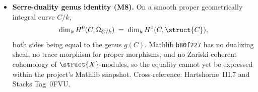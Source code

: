 \begin{itemize}
  \item \textbf{Serre-duality genus identity (M8).} On a smooth proper geometrically integral curve \(C/k\),
  \[
    \dim_{k} H^{0}(C, \Omega_{C/k}) \;=\; \dim_{k} H^{1}(C, \struct{C}),
  \]
  both sides being equal to the genus \(g(C)\). Mathlib \texttt{b80f227} has no dualizing sheaf, no trace morphism for proper morphisms, and no Zariski coherent cohomology of \(\struct{X}\)-modules, so the equality cannot yet be expressed within the project's Mathlib snapshot. Cross-reference: Hartshorne~III.7 and Stacks Tag~0FVU.
\end{itemize}
